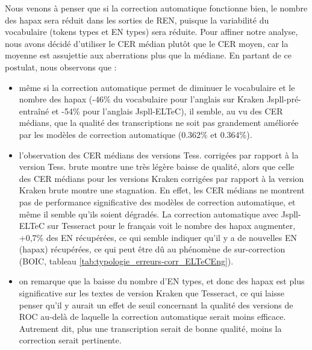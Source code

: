 Nous venons à penser que si la correction automatique fonctionne bien, le nombre des hapax sera réduit dans les sorties de REN, puisque la variabilité du vocabulaire (tokens types et EN types) sera réduite. Pour affiner notre analyse, nous avons décidé d'utiliser le CER médian plutôt que le CER moyen, car la moyenne est assujettie aux aberrations plus que la médiane. En partant de ce postulat, nous observons que :
\begin{itemize}

\item même si la correction automatique permet de diminuer le vocabulaire et le nombre des hapax (-46\% du vocabulaire pour l'anglais sur Kraken Jspll-pré-entraîné et -54\% pour l'anglais Jspll-ELTeC), il semble, au vu des CER médians, que la qualité des transcriptions ne soit pas grandement améliorée par les modèles de correction automatique (0.362\% et 0.364\%). 
\item l'observation des CER médians des versions Tess. corrigées par rapport à la version Tess. brute montre une très légère baisse de qualité, alors que celle des CER médians pour les versions Kraken corrigées par rapport à la version Kraken brute montre une stagnation. En effet, les CER médians ne montrent pas de performance significative des modèles de correction automatique, et même il semble qu'ils soient dégradés. La correction automatique avec Jspll-ELTeC sur Tesseract pour le français voit le nombre des hapax augmenter, +0,7\% des EN récupérées, ce qui semble indiquer qu'il y a de nouvelles EN (hapax) récupérées, ce qui peut être dû au phénomène de sur-correction (BOIC, tableau \ref{tab:typologie_erreurs-corr_ELTeCEng}).
\item on remarque que la baisse du nombre d'EN types, et donc des hapax est plus significative sur les textes de version Kraken que Tesseract, ce qui laisse penser qu'il y aurait un effet de seuil concernant la qualité des versions de ROC au-delà de laquelle la correction automatique serait moins efficace. Autrement dit, plus une transcription serait de bonne qualité, moins la correction serait pertinente.
\end{itemize}


